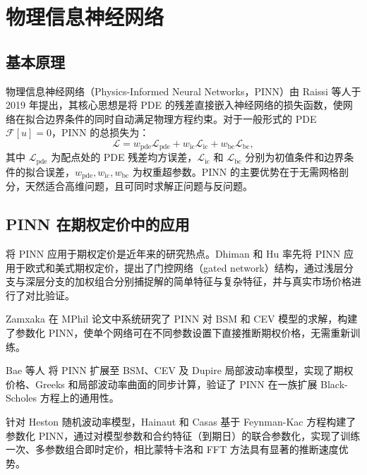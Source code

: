 \section{物理信息神经网络}\label{sec:pinn}

\subsection{基本原理}

物理信息神经网络（Physics-Informed Neural Networks，PINN）由 Raissi 等人\citep{raissi2019physics}于 2019 年提出，其核心思想是将 PDE 的残差直接嵌入神经网络的损失函数，使网络在拟合边界条件的同时自动满足物理方程约束。对于一般形式的 PDE $\mathcal{F}[u] = 0$，PINN 的总损失为：
\begin{equation}\label{eq:pinn_loss}
  \mathcal{L} = w_{\text{pde}}\mathcal{L}_{\text{pde}}
              + w_{\text{ic}}\mathcal{L}_{\text{ic}}
              + w_{\text{bc}}\mathcal{L}_{\text{bc}},
\end{equation}
其中 $\mathcal{L}_{\text{pde}}$ 为配点处的 PDE 残差均方误差，$\mathcal{L}_{\text{ic}}$ 和 $\mathcal{L}_{\text{bc}}$ 分别为初值条件和边界条件的拟合误差，$w_{\text{pde}},w_{\text{ic}},w_{\text{bc}}$ 为权重超参数。PINN 的主要优势在于无需网格剖分，天然适合高维问题，且可同时求解正问题与反问题。

\subsection{PINN 在期权定价中的应用}

将 PINN 应用于期权定价是近年来的研究热点。Dhiman 和 Hu\citep{dhiman2023pinn} 率先将 PINN 应用于欧式和美式期权定价，提出了门控网络（gated network）结构，通过浅层分支与深层分支的加权组合分别捕捉解的简单特征与复杂特征，并与真实市场价格进行了对比验证。

Zamxaka\citep{zamxaka2023cev} 在 MPhil 论文中系统研究了 PINN 对 BSM 和 CEV 模型的求解，构建了参数化 PINN，使单个网络可在不同参数设置下直接推断期权价格，无需重新训练。

Bae 等人\citep{bae2024localvol} 将 PINN 扩展至 BSM、CEV 及 Dupire 局部波动率模型，实现了期权价格、Greeks 和局部波动率曲面的同步计算，验证了 PINN 在一族扩展 Black-Scholes 方程上的通用性。

针对 Heston 随机波动率模型，Hainaut 和 Casas\citep{hainaut2024heston} 基于 Feynman-Kac 方程构建了参数化 PINN，通过对模型参数和合约特征（到期日）的联合参数化，实现了训练一次、多参数组合即时定价，相比蒙特卡洛和 FFT 方法具有显著的推断速度优势。

